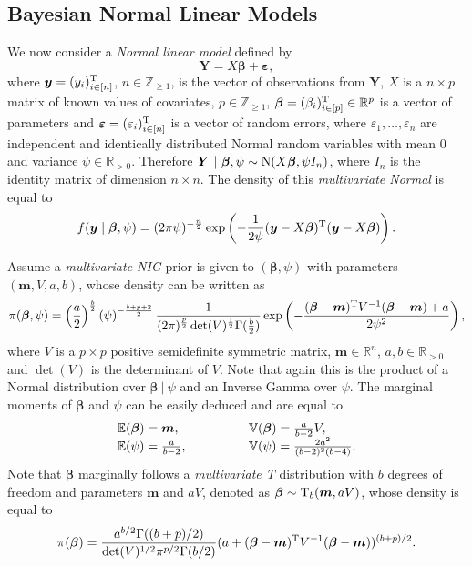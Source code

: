 \subsection{Bayesian Normal Linear Models}
We now consider a \textit{Normal linear model} defined by 
\begin{equation*}
\bm{Y}=X\bm{\beta}+\bm{\varepsilon},
\end{equation*}
where $\bm{y}=(y_i)_{i\in[n]}^{\textnormal{T}}$, $n\in\mathbb{Z}_{\geq 1}$, is the vector of observations from $\bm{Y}$, $X$ is a $n\times p$ matrix of known values of covariates, $p\in\mathbb{Z}_{\geq 1}$, $\bm{\beta}=(\beta_i)_{i\in[p]}^{\textnormal{T}}\in\mathbb{R}^p$ is a vector of parameters and $\bm{\varepsilon}=(\varepsilon_i)_{i\in[n]}^{\textnormal{T}}$ is a vector of random errors, where $\varepsilon_1,\dots,\varepsilon_n$ are independent and identically distributed  Normal random variables with mean $0$ and variance $\psi\in\mathbb{R}_{>0}$. Therefore $\bm{Y}~|~\bm{\beta},\psi\sim \textnormal{N}(X\bm{\beta},\psi I_n)$, where $I_n$ is the identity matrix of dimension $n\times n$. The density of this \textit{multivariate Normal} is equal to 
\begin{equation*}
f(\bm{y}\;|\;\bm{\beta},\psi)=(2\pi\psi)^{-\frac{n}{2}}\exp\left(-\frac{1}{2\psi}(\bm{y}-X\bm{\beta})^{\textnormal{T}}(\bm{y}-X\bm{\beta})\right).
\end{equation*}

Assume a \textit{multivariate NIG} prior is given to $(\bm{\beta},\psi)$ with parameters $(\bm{m},V,a,b)$, whose density can be written as
\begin{equation}
\label{eq:multinig}
\pi(\bm{\beta},\psi)=\left(\frac{a}{2}\right)^{\frac{b}{2}}\left(\psi\right)^{-\frac{b+p+2}{2}}\frac{1}{(2\pi)^{\frac{p}{2}}\det(V)^{\frac{1}{2}}\Gamma(\frac{b}{2})}\exp\left(-\frac{(\bm{\beta}-\bm{m})^\T V^{-1}(\bm{\beta}-\bm{m})+a}{2\psi^2}\right),
\end{equation}
where $V$ is a $p\times p$ positive semidefinite symmetric matrix, $\bm{m}\in\mathbb{R}^n$, $a,b\in\mathbb{R}_{>0}$ and $\det(V)$ is the determinant of $V$. Note that again this is the product of a Normal distribution over $\bm{\beta}~|~\psi$ and an Inverse Gamma over $\psi$. The marginal moments of $\bm{\beta}$ and $\psi$ can be easily deduced and are equal to 
\begin{equation*}
\begin{array}{lccccl}
\mathbb{E}(\bm{\beta})=\bm{m},&&&&&\mathbb{V}(\bm{\beta})=\frac{a}{b-2}V,\\
\mathbb{E}(\psi)=\frac{a}{b-2}, &&&&&\mathbb{V}(\psi)=\frac{2a^2}{(b-2)^2(b-4)}.
\end{array}
\end{equation*}
Note that $\bm{\beta}$ marginally follows a \textit{multivariate T} distribution with $b$ degrees of freedom and parameters $\bm{m}$ and $aV$, denoted as $\bm{\beta}\sim \textnormal{T}_b(\bm{m},aV)$, whose density is equal to
\begin{equation*}
\pi(\bm{\beta})=\frac{a^{b/2}\Gamma((b+p)/2)}{\det(V)^{1/2}\pi^{p/2}\Gamma(b/2)}(a+(\bm{\beta}-\bm{m})^{\textnormal{T}} V^{-1}(\bm{\beta}-\bm{m}))^{(b+p)/2}.
\end{equation*} 

